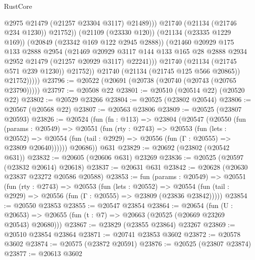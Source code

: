 \begin{lexlean}{RustCore}
\begin{coremodule}
                              @2975
                              @21479
                              (@21257 @23304 @3117)
                              @21489)))
                        @21740
                        (@21134 (@21746 @234 @1230))
                        @21752))
                    (@21109 (@23330 @120))
                    (@21134 (@23335 @1229 @169))
                    (@20849 (@23342 @169 @122 @2945 @2888))
                    (@21460
                      @20929
                      @175
                      @133
                      @2888
                      @2954
                      (@21469
                        @20929
                        @3117
                        @144
                        @133
                        @165
                        @28
                        @2888
                        @2934
                        @2952
                        @21479
                        (@21257 @20929 @3117)
                        @22241)))
                  @21740
                  (@21134 (@21745 @571 @239 @1230))
                  @21752))
              @21740
              (@21134 (@21745 @125 @566 @20865))
              @21752)))))
@23796 := @20522 (@20691 (@20738 (@20740 (@20743 (@20765 @23790)))))
@23797 := @20508 @22
@23801 := @20510 (@20514 @22) (@20520 @22)
@23802 := @20529 @23266
@23804 := @20525 (@23802 @20544)
@23806 := @20567 (@20568 @22)
@23807 := @20563 @23806
@23809 := @20525 (@23807 @20593)
@23826 := @20524
    (fun (fn : @113) =>
    @23804
      (@20547
        (@20550
          (fun (params : @20549) =>
          @20551
            (fun (rty : @2743) =>
            @20553
              (fun (lets : @20552) =>
              @20554 (fun (tail : @2929) => @20556 (fun (Γ : @20555) => @23809 @20640))))))
        @20686))
    @631
@23829 := @20692 (@23802 (@20542 @631))
@23832 := @20605 (@20606 @631) @23269
@23836 := @20525 (@20597 (@23832 @20614) @20618)
@23837 := @20631 @631
@23842 := @20628 (@20630 @23837 @23272 @20586 @20588)
@23853 := fun (params : @20549) =>
  @20551
    (fun (rty : @2743) =>
    @20553
      (fun (lets : @20552) =>
      @20554 (fun (tail : @2929) => @20556 (fun (Γ : @20555) => @23809 (@23836 @23842)))))
@23854 := @20550 @23853
@23855 := @20547 @23854
@23864 := @20654
    (fun (U : @20653) => @20655 (fun (t : @7) => @20663 (@20525 (@20669 @23269 @20543) @20680)))
@23867 := @23829 (@23855 @23864) @23267
@23869 := @20510 @23854 @23864
@23871 := @20741 @23853 @3602
@23872 := @20578 @3602
@23874 := @20575 (@23872 @20591)
@23876 := @20525 (@23807 @23874)
@23877 := @20613 @3602

\end{coremodule}
\end{lexlean}
